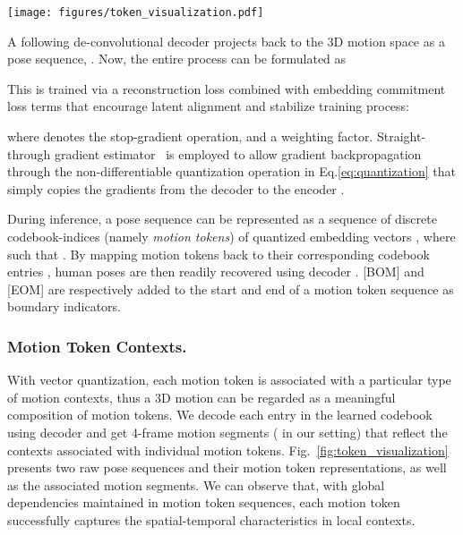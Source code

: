 \documentclass[runningheads]{llncs}
\newcommand{\beforefigcaption}{\vspace{-9mm}}
\newcommand{\afterfigcaption}{\vspace{-5mm}}
\newcommand{\beforesubsubsection}{\vspace{-5mm}}
\begin{document}
\begin{figure*}[t]
	\centering
	\texttt{[image: figures/token\_visualization.pdf]}
		 \beforefigcaption
	\caption{Exemplar results of motion tokens (middle) and their corresponding pose sequences (top and bottom). Here two 24-frame pose sequence examples are presented; each is reconstructed from a motion token sequences of size 6. Each motion token is associated with a specific local spatial-temporal context, visualized in 4-frame motions.}
	\label{fig:token_visualization}
	 \afterfigcaption
\end{figure*}

A following de-convolutional decoder  projects  back to the 3D motion space as a pose sequence, . Now, the entire process can be formulated as

This is trained via a reconstruction loss combined with embedding commitment loss terms that encourage latent alignment and stabilize training process:

where  denotes the stop-gradient operation, and  a weighting factor. Straight-through gradient estimator~\cite{van2017neural} is employed to allow gradient backpropagation through the non-differentiable quantization operation in Eq.\eqref{eq:quantization} that simply copies the gradients from the decoder  to the encoder . 

During inference, a pose sequence  can be represented as a sequence of discrete codebook-indices  (namely \textit{motion tokens}) of quantized embedding vectors , where  such that . By mapping motion tokens back to their corresponding codebook entries , human poses are then readily recovered using decoder . [BOM] and [EOM] are respectively added to the start and end of a motion token sequence as boundary indicators.

\beforesubsubsection
\subsubsection{Motion Token Contexts.} With vector quantization, each motion token is associated with a particular type of motion contexts, thus a 3D motion can be regarded as a meaningful composition of motion tokens. We decode each entry in the learned codebook  using decoder  and get 4-frame motion segments ( in our setting) that reflect the contexts associated with individual motion tokens. Fig.~\ref{fig:token_visualization} presents two raw pose sequences and their motion token representations, as well as the associated motion segments. We can observe that, with global dependencies maintained in motion token sequences, each motion token successfully captures the spatial-temporal characteristics in local contexts. 
\end{document}
